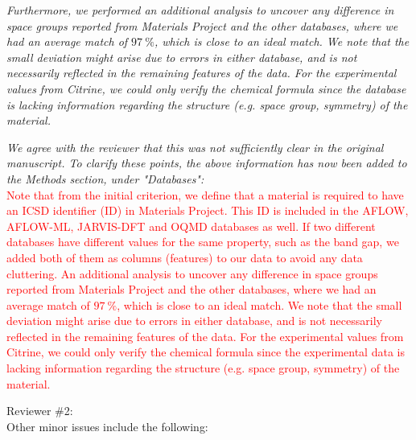 \documentclass[11pt, a4paper]{letter} %
\newcommand{\mrk}[1]{\textcolor{red}{#1}}
\begin{document}

\textit{Furthermore, we performed an additional analysis to uncover any difference in space groups reported from Materials Project and the other databases, where we had an average match of $97 \ \%$, which is close to an ideal match. We note that the small deviation might arise due to errors in either database, and is not necessarily reflected in the remaining features of the data. For the experimental values from Citrine, we could only verify the chemical formula since the database is lacking information regarding the structure (e.g. space group, symmetry) of the material.}

\textit{We agree with the reviewer that this was not sufficiently clear in the original manuscript. To clarify these points, the above information has now been added to the Methods section, under "Databases": } \\ 
\mrk{Note that from the initial criterion, we define that a material is required to have an ICSD identifier (ID) in Materials Project. This ID is included in the AFLOW,  AFLOW-ML, JARVIS-DFT and OQMD databases as well. If two different databases have different values for the same property, such as the band gap, we added both of them as columns (features) to our data to avoid any data cluttering. An additional analysis to uncover any difference in space groups reported from Materials Project and the other databases, where we had an average match of $97 \ \%$, which is close to an ideal match. We note that the small deviation might arise due to errors in either database, and is not necessarily reflected in the remaining features of the data. For the experimental values from Citrine, we could only verify the chemical formula since the experimental data is lacking information regarding the structure (e.g. space group, symmetry) of the material.}

Reviewer \#2: \\
Other minor issues include the following: 
\end{document}

